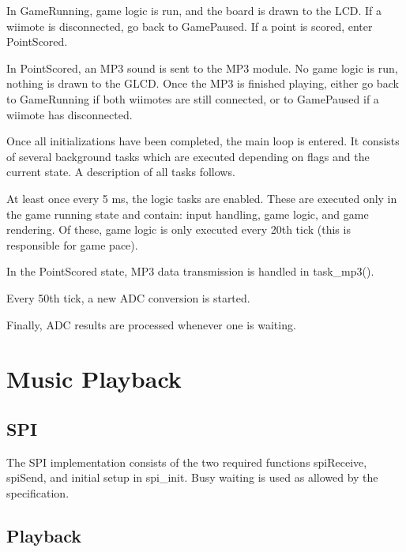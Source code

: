 \documentclass[12pt,a4paper,titlepage,oneside]{article}
\begin{document}
In GameRunning, game logic is run, and the board is drawn to the LCD.
If a wiimote is disconnected, go back to GamePaused.
If a point is scored, enter PointScored.

In PointScored, an MP3 sound is sent to the MP3 module. No game logic
is run, nothing is drawn to the GLCD.
Once the MP3 is finished playing, either go back to GameRunning
if both wiimotes are still connected,
or to GamePaused if a wiimote has disconnected.

Once all initializations have been completed, the main loop is entered.
It consists of several background tasks which are executed depending on 
flags and the current state. A description of all tasks follows.

At least once every 5 ms, the logic tasks are enabled. These are executed only in 
the game running state and contain: input handling, game logic, and game rendering.
Of these, game logic is only executed every 20th tick (this is responsible for game
pace).

In the PointScored state, MP3 data transmission is handled in task\_mp3().

Every 50th tick, a new ADC conversion is started.

Finally, ADC results are processed whenever one is waiting.


\section{Music Playback}

\subsection{SPI}

The SPI implementation consists of the two required functions spiReceive,
spiSend, and initial setup in spi\_init. Busy waiting is used as allowed
by the specification.

\subsection{Playback}
\end{document}
